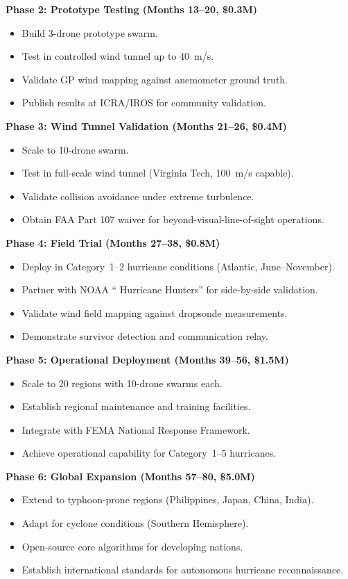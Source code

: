 \documentclass[12pt,a4paper,twocolumn]{article}
\begin{document}
\begin{enumerate}[leftmargin=*]
\textbf{Phase 2: Prototype Testing (Months 13--20, \$0.3M)}
\begin{itemize}[leftmargin=*]
    \item Build 3-drone prototype swarm.
    \item Test in controlled wind tunnel up to 40~m/s.
    \item Validate GP wind mapping against anemometer ground truth.
    \item Publish results at ICRA/IROS for community validation.
\end{itemize}

\textbf{Phase 3: Wind Tunnel Validation (Months 21--26, \$0.4M)}
\begin{itemize}[leftmargin=*]
    \item Scale to 10-drone swarm.
    \item Test in full-scale wind tunnel (Virginia Tech, 100~m/s capable).
    \item Validate collision avoidance under extreme turbulence.
    \item Obtain FAA Part 107 waiver for beyond-visual-line-of-sight operations.
\end{itemize}

\textbf{Phase 4: Field Trial (Months 27--38, \$0.8M)}
\begin{itemize}[leftmargin=*]
    \item Deploy in Category~1--2 hurricane conditions (Atlantic, June--November).
    \item Partner with NOAA `` Hurricane Hunters'' for side-by-side validation.
    \item Validate wind field mapping against dropsonde measurements.
    \item Demonstrate survivor detection and communication relay.
\end{itemize}

\textbf{Phase 5: Operational Deployment (Months 39--56, \$1.5M)}
\begin{itemize}[leftmargin=*]
    \item Scale to 20 regions with 10-drone swarms each.
    \item Establish regional maintenance and training facilities.
    \item Integrate with FEMA National Response Framework.
    \item Achieve operational capability for Category~1--5 hurricanes.
\end{itemize}

\textbf{Phase 6: Global Expansion (Months 57--80, \$5.0M)}
\begin{itemize}[leftmargin=*]
    \item Extend to typhoon-prone regions (Philippines, Japan, China, India).
    \item Adapt for cyclone conditions (Southern Hemisphere).
    \item Open-source core algorithms for developing nations.
    \item Establish international standards for autonomous hurricane reconnaissance.
\end{itemize}


\end{enumerate}
\end{document}
